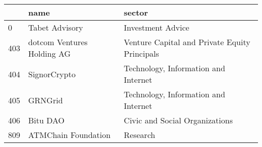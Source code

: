 \begin{tabular}{lll}
\toprule
{} &                        name &                                         sector \\
\midrule
0   &              Tabet Advisory &                              Investment Advice \\
403 &  dotcom Ventures Holding AG &  Venture Capital and Private Equity Principals \\
404 &                SignorCrypto &           Technology, Information and Internet \\
405 &                     GRNGrid &           Technology, Information and Internet \\
406 &                    Bitu DAO &                 Civic and Social Organizations \\
809 &         ATMChain Foundation &                                       Research \\
\bottomrule
\end{tabular}
